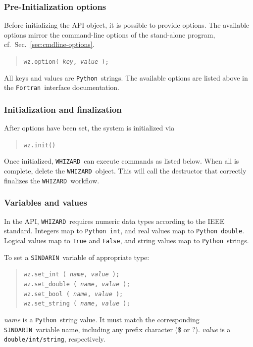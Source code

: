 \documentclass[12pt]{book}
\newcommand{\ttt}[1]{\texttt{#1}}
\newcommand{\whizard}{\ttt{WHIZARD}}
\newcommand{\sindarin}{\ttt{SINDARIN}}
\newcommand{\fortran}{\ttt{Fortran}}
\newcommand{\python}{\ttt{Python}}
\begin{document}
\subsubsection{Pre-Initialization options}
Before initializing the API object, it is possible to provide options.  The
available options mirror the command-line options of the stand-alone program,
cf.\ Sec.~\ref{sec:cmdline-options}.
\begin{quote}
  \tt  wz.option( \textit{key}, \textit{value} );
\end{quote}
All keys and values are \python\ strings.  The available options are
listed above in the \fortran\ interface documentation.

\subsubsection{Initialization and finalization}
After options have been set, the system is initialized via
\begin{quote}
  \tt wz.init()
\end{quote}
Once initialized, \whizard\ can execute commands as listed below.  When all
is complete, delete the \whizard\ object.  This will call the destructor that
correctly finalizes the \whizard\ workflow.

\subsubsection{Variables and values}

In the API, \whizard\ requires numeric data types according to the IEEE
standard.  Integers map to \ttt{Python int}, and real values map to \ttt{Python
double}.  Logical values map to \ttt{True} and \ttt{False},
and string values map to \python\ strings.

To set a \sindarin\ variable of appropriate type:
\begin{quote}
  \tt wz.set\_int ( \textit{name}, \textit{value} );
  \\
  \tt wz.set\_double ( \textit{name}, \textit{value} );
  \\
  \tt wz.set\_bool ( \textit{name}, \textit{value} );
  \\
  \tt wz.set\_string ( \textit{name}, \textit{value} );
\end{quote}
\textit{name} is a \python\ string value.  It must match the corresponding
\sindarin\ variable name, including any prefix character (\$ or ?).
\textit{value} is a \ttt{double/int/string}, respectively.
\end{document}
